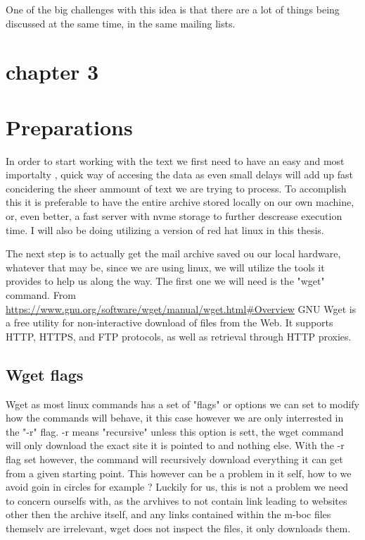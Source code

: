 \documentclass{report}
\begin{document}
One of the big challenges with this idea is that there are a lot of things being discussed at the same time, in the same mailing lists.


\chapter {chapter 3 }

\chapter{Preparations}

In order to start working with the text we first need to have an easy and most importalty , quick way of accesing the data as even small delays will add up fast concidering the sheer ammount of text we are trying to process. To accomplish this it is preferable to have the entire archive stored locally on our own machine, or, even better, a fast server with nvme storage to further descrease execution time.
I will also be doing utilizing a version of red hat linux in this thesis.

The next step is to actually get the mail archive saved ou our local hardware, whatever that may be, since we are using linux, we will utilize the tools it provides to help us along the way. The first one we will need is the "wget" command.
From \url{ https://www.gnu.org/software/wget/manual/wget.html#Overview}
GNU Wget is a free utility for non-interactive download of files from the Web. It supports HTTP, HTTPS, and FTP protocols, as well as retrieval through HTTP proxies.

\section{Wget flags}
Wget as most linux commands has a set of "flags" or options we can set to modify how the commands will behave, it this case however we are only interrested in the "-r" flag.
-r means "recursive" unless this option is sett, the wget command will only download the exact site it is pointed to and nothing else.
With the -r flag set however, the command will recursively download everything it can get from a given starting point. This however can be a problem in it self, how to we avoid goin in circles for example ?
Luckily for us, this is not a problem we need to concern ourselfs with, as the arvhives to not contain link leading to websites other then the archive itself, and any links contained within the m-boc files themselv are irrelevant, wget does not inspect the files, it only downloads them.
\end{document}
